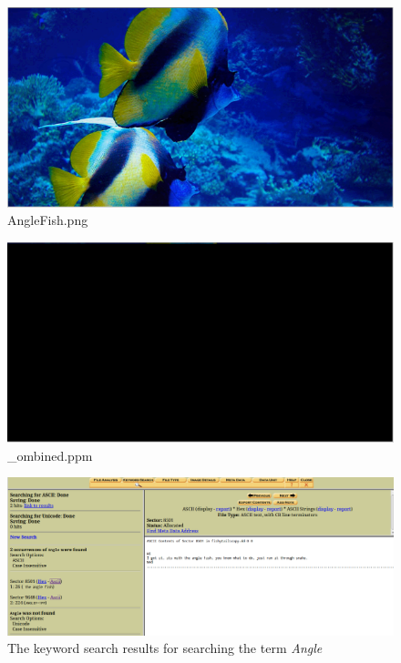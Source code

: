 \documentclass[12pt]{article}
\begin{document}
				\begin{figure}[ht!]
					\centering
					\includegraphics[width=12cm]{Images/AngleFishPng.png}
					\caption{AngleFish.png}
				\end{figure}

				\begin{figure}[ht!]
					\centering
					\includegraphics[width=12cm]{Images/_ombinedPpm.png}
					\caption{\_ombined.ppm}
				\end{figure}

				\clearpage

				\begin{figure}[h]
					\centering
					\includegraphics[width=12cm]{Images/AngleKeyWord.png}
					\caption{The keyword search results for searching the term \textit{Angle}}
				\end{figure}
\end{document}
